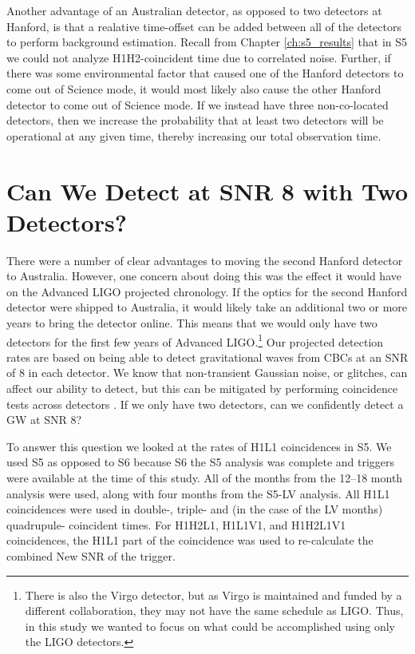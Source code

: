 Another advantage of an Australian detector, as opposed to two detectors at
Hanford, is that a realative time-offset can be added between all of the
detectors to perform background estimation. Recall from Chapter
\ref{ch:s5_results} that in \ac{S5} we could not analyze H1H2-coincident time
due to correlated noise. Further, if there was some environmental factor that
caused one of the Hanford detectors to come out of Science mode, it would most
likely also cause the other Hanford detector to come out of Science mode. If we
instead have three non-co-located detectors, then we increase the probability
that at least two detectors will be operational at any given time, thereby
increasing our total observation time.

\section{Can We Detect at SNR 8 with Two Detectors?}

There were a number of clear advantages to moving the second Hanford detector
to Australia. However, one concern about doing this was the effect it would
have on the Advanced LIGO projected chronology. If the optics for the second
Hanford detector were shipped to Australia, it would likely take an additional
two or more years to bring the detector online. This means that we would only
have two detectors for the first few years of Advanced
\ac{LIGO}.\footnote{There is also the Virgo detector, but as Virgo is
maintained and funded by a different collaboration, they may not have the same
schedule as \ac{LIGO}. Thus, in this study we wanted to focus on what could be
accomplished using only the \ac{LIGO} detectors.} Our projected detection rates
are based on being able to detect gravitational waves from \acp{CBC} at an
\ac{SNR} of $8$ in each detector. We know that non-transient Gaussian noise, or
glitches, can affect our ability to detect, but this can be mitigated by
performing coincidence tests across detectors \cite{Robinson:2008}. If we only
have two detectors, can we confidently detect a \ac{GW} at \ac{SNR} $8$?

To answer this question we looked at the rates of H1L1 coincidences in \ac{S5}.
We used \ac{S5} as opposed to \ac{S6} because \ac{S6} the \ac{S5} analysis was
complete and triggers were available at the time of this study. All of the
months from the 12--18 month analysis were used, along with four months from
the \ac{S5}-LV analysis. All H1L1 coincidences were used in double-, triple-
and (in the case of the LV months) quadrupule- coincident times. For H1H2L1,
H1L1V1, and H1H2L1V1 coincidences, the H1L1 part of the coincidence was used to
re-calculate the combined New \ac{SNR} of the trigger.

